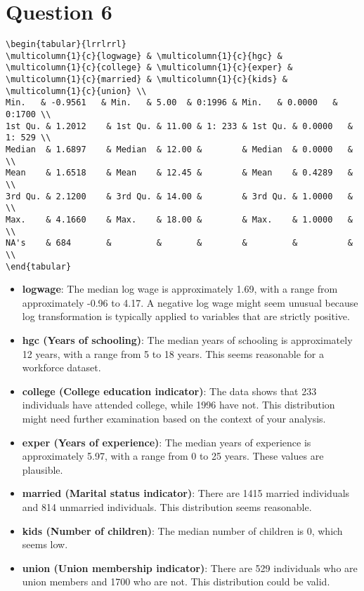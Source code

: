 \documentclass{article}
\begin{document}
\section*{Question 6}

\begin{verbatim}
\begin{tabular}{lrrlrrl}
\multicolumn{1}{c}{logwage} & \multicolumn{1}{c}{hgc} & \multicolumn{1}{c}{college} & \multicolumn{1}{c}{exper} & \multicolumn{1}{c}{married} & \multicolumn{1}{c}{kids} & \multicolumn{1}{c}{union} \\
Min.   & -0.9561   & Min.   & 5.00  & 0:1996 & Min.   & 0.0000   & 0:1700 \\
1st Qu. & 1.2012    & 1st Qu. & 11.00 & 1: 233 & 1st Qu. & 0.0000   & 1: 529 \\
Median  & 1.6897    & Median  & 12.00 &        & Median  & 0.0000   &        \\
Mean    & 1.6518    & Mean    & 12.45 &        & Mean    & 0.4289   &        \\
3rd Qu. & 2.1200    & 3rd Qu. & 14.00 &        & 3rd Qu. & 1.0000   &        \\
Max.    & 4.1660    & Max.    & 18.00 &        & Max.    & 1.0000   &        \\
NA's    & 684       &         &       &        &         &          &        \\
\end{tabular}
\end{verbatim}

\begin{itemize}
\item \textbf{logwage}: The median log wage is approximately 1.69, with a range from approximately -0.96 to 4.17. A negative log wage might seem unusual because log transformation is typically applied to variables that are strictly positive.
\item \textbf{hgc (Years of schooling)}: The median years of schooling is approximately 12 years, with a range from 5 to 18 years. This seems reasonable for a workforce dataset.
\item \textbf{college (College education indicator)}: The data shows that 233 individuals have attended college, while 1996 have not. This distribution might need further examination based on the context of your analysis.
\item \textbf{exper (Years of experience)}: The median years of experience is approximately 5.97, with a range from 0 to 25 years. These values are plausible.
\item \textbf{married (Marital status indicator)}: There are 1415 married individuals and 814 unmarried individuals. This distribution seems reasonable.
\item \textbf{kids (Number of children)}: The median number of children is 0, which seems low.
\item \textbf{union (Union membership indicator)}: There are 529 individuals who are union members and 1700 who are not. This distribution could be valid.
\end{itemize}
\end{document}
